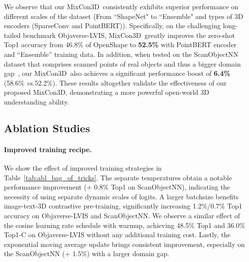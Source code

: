 \documentclass{article} \usepackage{iclr2024_conference,times}
\def\vs{\textit{vs.}}
\newcommand{\ourmethod}{MixCon3D}
\begin{document}
We observe that our \ourmethod~consistently exhibits superior performance on different scales of the dataset (From ``ShapeNet" to ``Ensemble" and types of 3D encoders (SparseConv and PointBERT)). 
Specifically, on the challenging long-tailed benchmark Objaverse-LVIS, \ourmethod~greatly improves the zero-shot Top1 accuracy from 46.8\% of OpenShape to \textbf{52.5\%} with PointBERT encoder and ``Ensemble'' training data.
In addition, when tested on the ScanObjectNN dataset that comprises scanned points of real objects and thus a bigger domain gap~\citep{scanobjectnn}, our \ourmethod~also achieves a significant performance boost of \textbf{6.4\%} (58.6\% \vs 52.2\%).
These results altogether validate the effectiveness of our proposed \ourmethod, demonstrating a more powerful open-world 3D understanding ability. 


\subsection{Ablation Studies}
\label{subsec:abl_studies}

\paragraph{Improved training recipe.}
We show the effect of improved training strategies in Table~\ref{tab:abl_bag_of_tricks}. 
The separate temperatures obtain a notable performance improvement (+ 0.8\% Top1 on ScanObjectNN), indicating the necessity of using separate dynamic scales of logits.
A larger batchsize benefits image-text-3D contrastive pre-training, significantly increasing 1.2\%/0.7\% Top1 accuracy on Objaverse-LVIS and ScanObjectNN.   
We observe a similar effect of the cosine learning rate schedule with warmup, achieving 48.5\% Top1 and 36.0\% Top1-C on Objaverse-LVIS without any additional training cost. 
Lastly, the exponential moving average update brings consistent improvement, especially on the ScanObjectNN (+ 1.5\%) with a larger domain gap.
\end{document}
